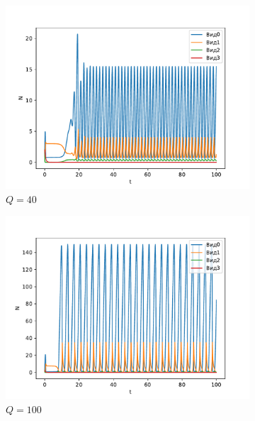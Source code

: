     \begin{figure}[H]
        \centering
        \begin{subfigure}[t]{.3\linewidth}
            \centering
            \includegraphics[width=\textwidth]{pictures/exp_flow/exp2_Q40.pdf}
            \caption{\(Q = 40\)}
        \end{subfigure}
        \begin{subfigure}[t]{.3\linewidth}
            \centering
            \includegraphics[width=\textwidth]{pictures/exp_flow/exp2_Q100.pdf}
            \caption{\(Q = 100\)}
        \end{subfigure}
        \begin{subfigure}[t]{.3\linewidth}
            \centering

\end{subfigure}
\end{figure}
